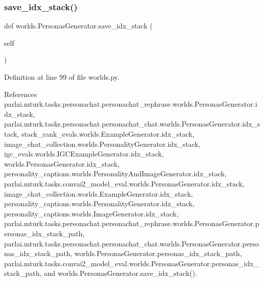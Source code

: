 \subsubsection{\texorpdfstring{save\+\_\+idx\+\_\+stack()}{save\_idx\_stack()}\hspace{0.1cm}{\footnotesize\ttfamily [1/2]}}
{\footnotesize\ttfamily def worlds.\+Personas\+Generator.\+save\+\_\+idx\+\_\+stack (\begin{DoxyParamCaption}\item[{}]{self }\end{DoxyParamCaption})}



Definition at line 99 of file worlds.\+py.



References parlai.\+mturk.\+tasks.\+personachat.\+personachat\+\_\+rephrase.\+worlds.\+Personas\+Generator.\+idx\+\_\+stack, parlai.\+mturk.\+tasks.\+personachat.\+personachat\+\_\+chat.\+worlds.\+Personas\+Generator.\+idx\+\_\+stack, stack\+\_\+rank\+\_\+evals.\+worlds.\+Example\+Generator.\+idx\+\_\+stack, image\+\_\+chat\+\_\+collection.\+worlds.\+Personality\+Generator.\+idx\+\_\+stack, igc\+\_\+evals.\+worlds.\+I\+G\+C\+Example\+Generator.\+idx\+\_\+stack, worlds.\+Personas\+Generator.\+idx\+\_\+stack, personality\+\_\+captions.\+worlds.\+Personality\+And\+Image\+Generator.\+idx\+\_\+stack, parlai.\+mturk.\+tasks.\+convai2\+\_\+model\+\_\+eval.\+worlds.\+Personas\+Generator.\+idx\+\_\+stack, image\+\_\+chat\+\_\+collection.\+worlds.\+Example\+Generator.\+idx\+\_\+stack, personality\+\_\+captions.\+worlds.\+Personality\+Generator.\+idx\+\_\+stack, personality\+\_\+captions.\+worlds.\+Image\+Generator.\+idx\+\_\+stack, parlai.\+mturk.\+tasks.\+personachat.\+personachat\+\_\+rephrase.\+worlds.\+Personas\+Generator.\+personas\+\_\+idx\+\_\+stack\+\_\+path, parlai.\+mturk.\+tasks.\+personachat.\+personachat\+\_\+chat.\+worlds.\+Personas\+Generator.\+personas\+\_\+idx\+\_\+stack\+\_\+path, worlds.\+Personas\+Generator.\+personas\+\_\+idx\+\_\+stack\+\_\+path, parlai.\+mturk.\+tasks.\+convai2\+\_\+model\+\_\+eval.\+worlds.\+Personas\+Generator.\+personas\+\_\+idx\+\_\+stack\+\_\+path, and worlds.\+Personas\+Generator.\+save\+\_\+idx\+\_\+stack().

